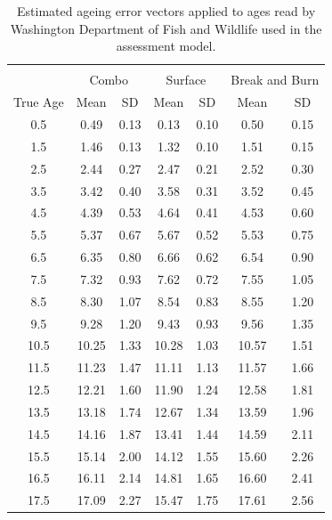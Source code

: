 \documentclass[12pt,]{article}
\begin{document}
\FloatBarrier

\begin{table}[ht]
\centering
\caption{Estimated ageing error vectors applied to ages read by Washington Department of Fish and Wildlife used in the assessment model.} 
\label{tab:age_error2}
\begin{tabular}{ccccccc}
  \hline
 &  &  &  &  &  &  \\ 
   & \multicolumn{2}{c}{Combo} &  \multicolumn{2}{c}{Surface} & \multicolumn{2}{c}{Break and Burn} \\
 True Age & Mean & SD & Mean &  SD  & Mean &  SD  \\
 \hline
0.5 & 0.49 & 0.13 & 0.13 & 0.10 & 0.50 & 0.15 \\ 
  1.5 & 1.46 & 0.13 & 1.32 & 0.10 & 1.51 & 0.15 \\ 
  2.5 & 2.44 & 0.27 & 2.47 & 0.21 & 2.52 & 0.30 \\ 
  3.5 & 3.42 & 0.40 & 3.58 & 0.31 & 3.52 & 0.45 \\ 
  4.5 & 4.39 & 0.53 & 4.64 & 0.41 & 4.53 & 0.60 \\ 
  5.5 & 5.37 & 0.67 & 5.67 & 0.52 & 5.53 & 0.75 \\ 
  6.5 & 6.35 & 0.80 & 6.66 & 0.62 & 6.54 & 0.90 \\ 
  7.5 & 7.32 & 0.93 & 7.62 & 0.72 & 7.55 & 1.05 \\ 
  8.5 & 8.30 & 1.07 & 8.54 & 0.83 & 8.55 & 1.20 \\ 
  9.5 & 9.28 & 1.20 & 9.43 & 0.93 & 9.56 & 1.35 \\ 
  10.5 & 10.25 & 1.33 & 10.28 & 1.03 & 10.57 & 1.51 \\ 
  11.5 & 11.23 & 1.47 & 11.11 & 1.13 & 11.57 & 1.66 \\ 
  12.5 & 12.21 & 1.60 & 11.90 & 1.24 & 12.58 & 1.81 \\ 
  13.5 & 13.18 & 1.74 & 12.67 & 1.34 & 13.59 & 1.96 \\ 
  14.5 & 14.16 & 1.87 & 13.41 & 1.44 & 14.59 & 2.11 \\ 
  15.5 & 15.14 & 2.00 & 14.12 & 1.55 & 15.60 & 2.26 \\ 
  16.5 & 16.11 & 2.14 & 14.81 & 1.65 & 16.60 & 2.41 \\ 
  17.5 & 17.09 & 2.27 & 15.47 & 1.75 & 17.61 & 2.56 \\ 
   \hline
\end{tabular}
\end{table}

\FloatBarrier
\end{document}

